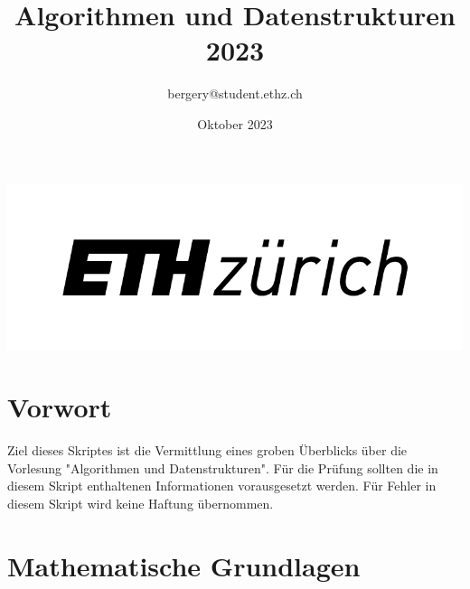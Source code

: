 \documentclass[a4paper]{article}
\title{Algorithmen und Datenstrukturen 2023}
\author{bergery@student.ethz.ch}
\date{Oktober 2023}
\begin{document}
\maketitle
\begin{center}
    \includegraphics{Pictures/eth_logo_kurz_pos Kopie.png}
\end{center}

\tableofcontents
\newpage

\section{Vorwort}
Ziel dieses Skriptes ist die Vermittlung eines groben Überblicks über die Vorlesung "Algorithmen und Datenstrukturen". Für die Prüfung sollten die in diesem Skript enthaltenen Informationen vorausgesetzt werden. Für Fehler in diesem Skript wird keine Haftung übernommen.

\section{Mathematische Grundlagen}
\end{document}
